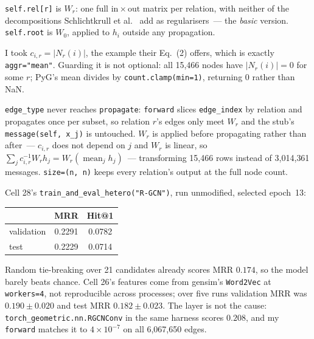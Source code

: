 \noindent
\texttt{self.rel[r]} is $W_r$: one full $\mathrm{in}\times\mathrm{out}$ matrix per
relation, with neither of the decompositions Schlichtkrull et al.~\cite{p2:rgcn} add as
regularisers~--- the \emph{basic} version. \texttt{self.root} is $W_0$, applied
to $h_i$ outside any propagation.

I took $c_{i,r}=|N_r(i)|$, the example their Eq.~(2) offers, which is exactly
\texttt{aggr="mean"}. Guarding it is not optional: all 15{,}466 nodes have
$|N_r(i)|=0$ for some $r$; PyG's mean divides by \texttt{count.clamp(min=1)},
returning $0$ rather than NaN.

\texttt{edge\_type} never reaches \texttt{propagate}: \texttt{forward} slices
\texttt{edge\_index} by relation and propagates once per subset, so relation $r$'s
edges only meet $W_r$ and the stub's
\texttt{message(self,\,x\_j)} is untouched. $W_r$ is applied before propagating rather
than after~--- $c_{i,r}$ does not depend on $j$ and $W_r$ is linear, so
$\sum_{j} c_{i,r}^{-1} W_r h_j = W_r\!\left(\operatorname{mean}_{j} h_j\right)$~---
transforming 15{,}466 rows instead of 3{,}014{,}361 messages. \texttt{size=(n,\,n)}
keeps every relation's output at the full node count.

\medskip
\noindent
Cell 28's \texttt{train\_and\_eval\_hetero("R-GCN")}, run unmodified, selected
epoch~13:

\begin{center}
\begin{tabular}{lcc}
\toprule
 & MRR & Hit@1 \\
\midrule
validation & 0.2291 & 0.0782 \\
test       & 0.2229 & 0.0714 \\
\bottomrule
\end{tabular}
\end{center}

\noindent
Random tie-breaking over 21 candidates already scores MRR $0.174$, so the model barely
beats chance. Cell 26's features come from gensim's \texttt{Word2Vec} at
\texttt{workers=4}, not reproducible across processes; over five runs validation MRR was
$0.190\pm0.020$ and test MRR $0.182\pm0.023$. The layer is not the cause:
\texttt{torch\_geometric.nn.RGCNConv} in the same harness scores $0.208$, and my
\texttt{forward} matches it to $4\times10^{-7}$ on all 6{,}067{,}650 edges.

